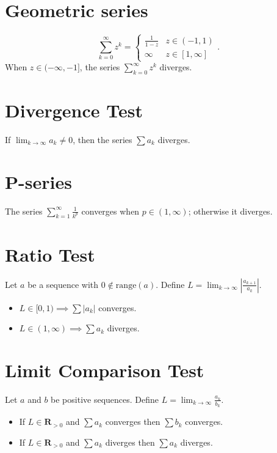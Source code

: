 \documentclass[letterpaper,9pt,fleqn]{extarticle}
\newcommand{\range}{\mathrm{range}}
\newcommand{\reals}{\mathbf{R}}
\begin{document}
\begin{multicols*}{2}
\newpage
\section*{Geometric series}
\begin{equation*}
\sum_{k=0}^\infty z^k = \begin{cases} \frac{1}{1-z} & z \in (-1,1) \\
                                      \infty & z \in [1,\infty] 
\end{cases}.
\end{equation*}
When $z \in (-\infty, -1]$, the series $\sum_{k=0}^\infty z^k$ diverges.


\section*{Divergence Test}
If $\lim_{k \to \infty} a_k  \neq 0$, then the series $\sum a_k$ diverges.



\section*{P-series}
The series \(\sum_{k=1}^\infty \frac{1}{k^p}\) converges when $p \in (1,\infty)$;
otherwise it diverges.

\section*{Ratio Test}
Let $a$ be a sequence with $0 \notin \range(a)$. Define 
$L = \lim_{k \to \infty} \left| \frac{a_{k+1}}{a_k} \right|$.
\begin{itemize}[noitemsep]
\item $L \in [0,1) \implies \sum |a_k| $ converges.
\item $L \in (1,\infty) \implies \sum a_k $ diverges.
\end{itemize}

\section*{Limit Comparison Test}

Let $a$ and $b$ be positive sequences. Define 
$L = \lim_{k \to \infty} \frac{a_k}{b_k}$.
\begin{itemize}[noitemsep]
    \item If $L \in \reals_{> 0}$ and $\sum a_k$ converges then  
    $\sum b_k$ converges.

    \item If $L \in \reals_{> 0}$ and $\sum a_k$ diverges then  
    $\sum a_k$ diverges.


\end{itemize}
\end{multicols*}
\end{document}
